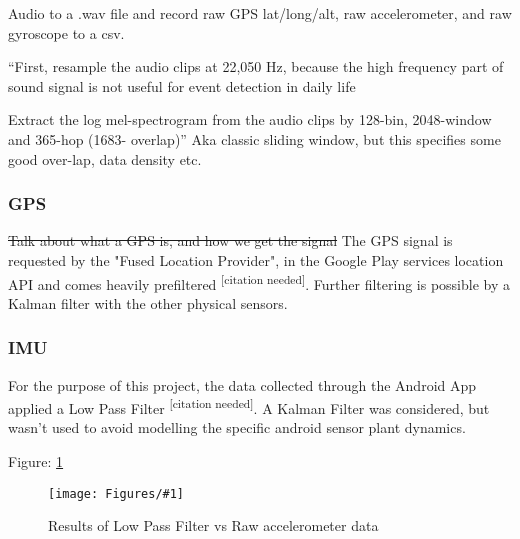 \documentclass{UoNMCHA}
\newcommand{\citationneeded}{\textsuperscript{\color{blue} [citation needed]}}
\newcommand{\fref}[1] {Figure: \ref{#1}}
\newcommand{\fFigure}[3]{
	\begin{figure}[h]
        \begin{center}  
            \texttt{[image: Figures/\#1]}  
            \caption{#2}
            \label{#1}
        \end{center}
	\end{figure}
}
\numberwithin{equation}{section}
\begin{document}
Audio to a .wav file and record raw GPS lat/long/alt, raw accelerometer, and raw gyroscope to a csv.  

“First, resample the audio clips at 22,050 Hz, because the high frequency part of sound signal is not useful for event detection in daily life

Extract the log mel-spectrogram from the audio clips by 128-bin, 2048-window and 365-hop (1683- overlap)”
Aka classic sliding window, but this specifies some good over-lap, data density etc.

\subsubsection{GPS}
\sout{Talk about what a GPS is, and how we get the signal}
The GPS signal is requested by the "Fused Location Provider", in the Google Play services location API and comes heavily prefiltered\citationneeded. Further filtering is possible by a Kalman filter with the other physical sensors.

\subsubsection{IMU}
For the purpose of this project, the data collected through the Android App applied a Low Pass Filter\citationneeded. A Kalman Filter was considered, but wasn't used to avoid modelling the specific android sensor plant dynamics.

\fref{AndroidDataExample.png}
\fFigure{AndroidDataExample.png}{Results of Low Pass Filter vs Raw accelerometer data}{0.8}




    
\end{document}
